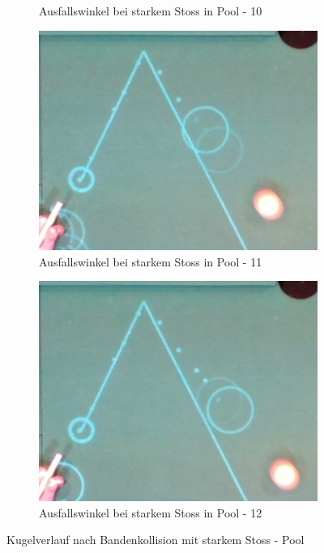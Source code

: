\begin{figure}[h!]
\begin{subfigure}[b]{0.2\textwidth}
        \caption{Ausfallswinkel bei starkem Stoss in Pool - 10}
        \label{fig:rebound_angle_fast_pool_10}
    \end{subfigure}
    \hfill
    \begin{subfigure}[b]{0.2\textwidth}
        \centering
        \includegraphics[width=1.0\linewidth]{../common/04_results/resources/simulation/rebound_angle_fast_pool/00_rail_rebound_angle_fast_pool_11.png}
        \caption{Ausfallswinkel bei starkem Stoss in Pool - 11}
        \label{fig:rebound_angle_fast_pool_11}
    \end{subfigure}
    \hfill
    \begin{subfigure}[b]{0.2\textwidth}
        \centering
        \includegraphics[width=1.0\linewidth]{../common/04_results/resources/simulation/rebound_angle_fast_pool/00_rail_rebound_angle_fast_pool_12.png}
        \caption{Ausfallswinkel bei starkem Stoss in Pool - 12}
        \label{fig:rebound_angle_fast_pool_12}
    \end{subfigure}
    \caption{Kugelverlauf nach Bandenkollision mit starkem Stoss - Pool}
    \label{fig:kugelverlauf_nach_bandenkollision_mit_starkem_stoss_pool}
\end{figure}


